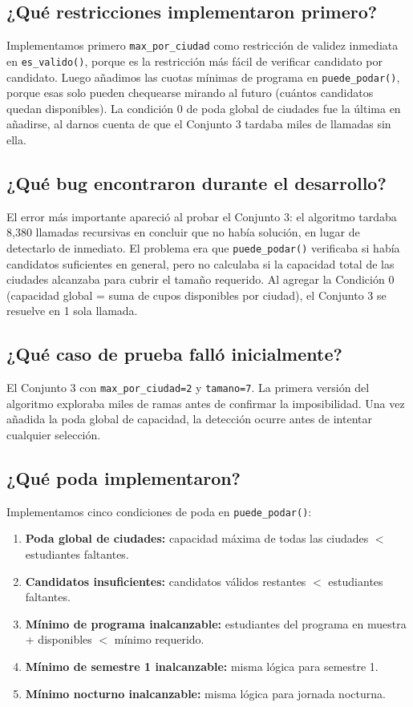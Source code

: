 \documentclass[12pt, a4paper]{article}
\begin{document}
\subsection*{¿Qué restricciones implementaron primero?}
Implementamos primero \texttt{max\_por\_ciudad} como restricción de validez inmediata en \texttt{es\_valido()}, porque es la restricción más fácil de verificar candidato por candidato. Luego añadimos las cuotas mínimas de programa en \texttt{puede\_podar()}, porque esas solo pueden chequearse mirando al futuro (cuántos candidatos quedan disponibles). La condición 0 de poda global de ciudades fue la última en añadirse, al darnos cuenta de que el Conjunto 3 tardaba miles de llamadas sin ella.

\subsection*{¿Qué bug encontraron durante el desarrollo?}
El error más importante apareció al probar el Conjunto 3: el algoritmo tardaba 8,380 llamadas recursivas en concluir que no había solución, en lugar de detectarlo de inmediato. El problema era que \texttt{puede\_podar()} verificaba si había candidatos suficientes en general, pero no calculaba si la capacidad total de las ciudades alcanzaba para cubrir el tamaño requerido. Al agregar la Condición 0 (capacidad global = suma de cupos disponibles por ciudad), el Conjunto 3 se resuelve en 1 sola llamada.

\subsection*{¿Qué caso de prueba falló inicialmente?}
El Conjunto 3 con \texttt{max\_por\_ciudad=2} y \texttt{tamano=7}. La primera versión del algoritmo exploraba miles de ramas antes de confirmar la imposibilidad. Una vez añadida la poda global de capacidad, la detección ocurre antes de intentar cualquier selección.

\subsection*{¿Qué poda implementaron?}
Implementamos cinco condiciones de poda en \texttt{puede\_podar()}:
\begin{enumerate}[noitemsep]
  \item \textbf{Poda global de ciudades:} capacidad máxima de todas las ciudades $<$ estudiantes faltantes.
  \item \textbf{Candidatos insuficientes:} candidatos válidos restantes $<$ estudiantes faltantes.
  \item \textbf{Mínimo de programa inalcanzable:} estudiantes del programa en muestra + disponibles $<$ mínimo requerido.
  \item \textbf{Mínimo de semestre 1 inalcanzable:} misma lógica para semestre 1.
  \item \textbf{Mínimo nocturno inalcanzable:} misma lógica para jornada nocturna.
\end{enumerate}
\end{document}
